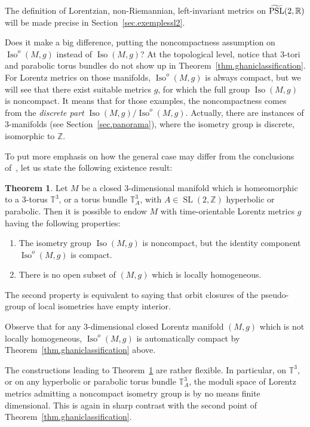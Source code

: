 \documentclass[11pt]{article}
\theoremstyle{definition}
\numberwithin{equation}{section}
\numberwithin{figure}{section}
\numberwithin{table}{section}
\newtheorem{thmx}{Theorem}
\DeclareMathOperator{\Iso}{Iso}
\DeclareMathOperator{\PSL}{PSL}
\DeclareMathOperator{\SL}{SL}
\newcommand*\TT{\mathbb{T}}
\newcommand*\RR{\mathbb{R}}
\newcommand*\ZZ{\mathbb{Z}}
\let\oldtilde\tilde
\renewcommand*\tilde[1]{\mathchoice{\widetilde{#1}}{\widetilde{#1}}{\widetilde{#1}}{\oldtilde{#1}}}
\begin{document}
The definition of Lorentzian, non-Riemannian, left-invariant metrics on $\tilde{\PSL}(2,\RR)$ will be made precise in Section~\ref{sec.exemplessl2}.

Does it make a big difference, putting the noncompactness assumption on $\Iso^o(M,g)$ instead of $\Iso(M,g)$? At the topological level, notice that $3$-tori and parabolic torus bundles do not show up in Theorem~\ref{thm.ghaniclassification}. For Lorentz metrics on those manifolds, $\Iso^o(M,g)$ is always compact, but we will see that there exist suitable metrics $g$, for which the full group $\Iso(M,g)$ is noncompact. It means that for those examples, the noncompactness comes from the \emph{discrete part} $\Iso(M,g)/\Iso^o(M,g)$. Actually, there are instances of $3$-manifolds (see Section~\ref{sec.panorama}), where the isometry group is discrete, isomorphic to $\ZZ$.

To put more emphasis on how the general case may differ from the conclusions of~\cite{zeghibflot}, let us state the following existence result:

\begin{thmx}\label{thm.nonhomogeneous}
Let $M$ be a closed $3$-dimensional manifold which is homeomorphic to a $3$-torus $\TT^3$, or a torus bundle $\TT_A^3$, with $A \in \SL(2,\ZZ)$ hyperbolic or parabolic. Then it is possible to endow $M$ with time-orientable Lorentz metrics $g$ having the following properties:
\begin{enumerate}
\item \label{list2.1}The isometry group $\Iso(M,g)$ is noncompact, but the identity component $\Iso^o(M,g)$ is compact.
\item \label{list2.2}There is no open subset of $(M,g)$ which is locally homogeneous.
\end{enumerate}
\end{thmx}

The second property is equivalent to saying that orbit closures of the pseudo-group of local isometries have empty interior.

Observe that for any $3$-dimensional closed Lorentz manifold $(M,g)$ which is not locally homogeneous, $\Iso^o(M,g)$ is automatically compact by Theorem~\ref{thm.ghaniclassification} above.

The constructions leading to Theorem~\ref{thm.nonhomogeneous} are rather flexible. In particular, on $\TT^3$, or on any hyperbolic or parabolic torus bundle ${\TT_A^3}$, the moduli space of Lorentz metrics admitting a noncompact isometry group is by no means finite dimensional. This is again in sharp contrast with the second point of Theorem~\ref{thm.ghaniclassification}.
\end{document}
